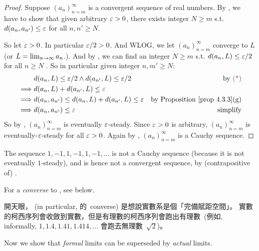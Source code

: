 \begin{proof}
Suppose \((a_n)_{n = m}^{\infty}\) is a convergent sequence of real numbers.
By , we have to show that given arbitrary \(\varepsilon > 0\), there exists integer \(N \ge m\) s.t. \(d(a_n, a_{n'}) \le \varepsilon\) for all \(n, n' \ge N\).

So let \(\varepsilon > 0\).
In particular \(\varepsilon/2 > 0\).
And WLOG, we let \((a_n)_{n = m}^{\infty}\) converge to \(L\) (or \(L = \lim_{n \to \infty} a_n\).).
And by , we can find an integer \(N \ge m\) s.t. \(d(a_n, L) \le \varepsilon/2\) for all \(n \ge N\) \MAROON{(*)}.
So in particular given integer \(n, m' \ge N\):
\begin{align*}
             & d(a_n, L) \le \varE/2 \land d(a_{n'}, L) \le \varE/2 & \text{by \MAROON{(*)}} \\
    \implies & d(a_n, L) + d(a_{n'}, L) \le \varE \\
    \implies & d(a_n, a_{n'}) \le d(a_n, L) + d(a_{n'}, L) \le \varE & \text{by \PROP{4.3.3}(g)} \\
    \implies & d(a_n, a_{n'}) \le \varE & \text{simplify}
\end{align*}
So by , \((a_n)_{n = m}^{\infty}\) is eventually \(\varepsilon\)-steady.
Since \(\varepsilon > 0\) is arbitrary, \((a_n)_{n = m}^{\infty}\) is eventually-\(\varepsilon\)-steady for all \(\varepsilon > 0\).
Again by , \((a_n)_{n = m}^{\infty}\) is a Cauchy sequence.
\end{proof}

\begin{example} \label{example 6.1.13}
The sequence \(1, -1, 1, -1, 1, -1,...\) is not a Cauchy sequence (because it is not eventually \(1\)-steady), and is hence not a
convergent sequence, by (contrapositive of) .
\end{example}

\begin{remark} \label{remark 6.1.14}
For a \emph{converse} to , see  below.
\end{remark}

\begin{note}
開天眼， (in particular,  的\ converse) 是想說實數系是個「完備賦距空間」。
實數的柯西序列會收斂到實數，但是有理數的柯西序列會跑出有理數\
(例如, informally, \(1, 1.4, 1.41, 1.414,...\) 會跑去無理數\ \(\sqrt{2}\))。
\end{note}

Now we show that \emph{formal} limits can be superseded by \emph{actual} limits.

